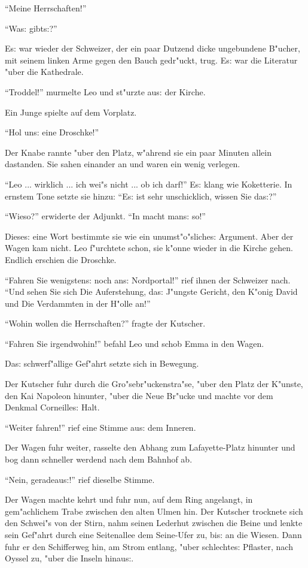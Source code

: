 \documentclass[oneside,12pt]{book}
\newcommand{\s}{s:}%
\begin{document}
"`Meine Herrschaften!"'

"`Wa{\s} gibt{\s}?"'

E{\s} war wieder der Schweizer, der ein paar Dutzend dicke
ungebundene B"ucher, mit seinem linken Arme gegen den Bauch
gedr"uckt, trug. E{\s} war die Literatur "uber die Kathedrale.

"`Troddel!"' murmelte Leo und st"urzte au{\s} der Kirche.

Ein Junge spielte auf dem Vorplatz.

"`Hol un{\s} eine Droschke!"'

Der Knabe rannte "uber den Platz, w"ahrend sie ein paar Minuten
allein dastanden. Sie sahen einander an und waren ein wenig
verlegen.

"`Leo ... wirklich ... ich wei"s nicht ... ob ich darf!"' E{\s}
klang wie Koketterie. In ernstem Tone setzte sie hinzu: "`E{\s}
ist sehr unschicklich, wissen Sie da{\s}?"'

"`Wieso?"' erwiderte der Adjunkt. "`In \so{Pari{\s}} macht man{\s}
so!"'

Diese{\s} eine Wort bestimmte sie wie ein unumst"o"sliche{\s}
Argument. Aber der Wagen kam nicht. Leo f"urchtete schon, sie
k"onne wieder in die Kirche gehen. Endlich erschien die Droschke.

"`Fahren Sie wenigsten{\s} noch an{\s} Nordportal!"' rief ihnen
der Schweizer nach. "`Und sehen Sie sich {\glq}Die
Auferstehung{\grq}, da{\s} {\glq}J"ungste Gericht{\grq}, den
{\glq}K"onig David{\grq} und {\glq}Die Verdammten in der
H"olle{\grq} an!"'

"`Wohin wollen die Herrschaften?"' fragte der Kutscher.

"`Fahren Sie irgendwohin!"' befahl Leo und schob Emma in den Wagen.

Da{\s} schwerf"allige Gef"ahrt setzte sich in Bewegung.

Der Kutscher fuhr durch die Gro"sebr"uckenstra"se, "uber den Platz
der K"unste, den Kai Napoleon hinunter, "uber die Neue Br"ucke und
machte vor dem Denkmal Corneille{\s} Halt.

"`Weiter fahren!"' rief eine Stimme au{\s} dem Inneren.

Der Wagen fuhr weiter, rasselte den Abhang zum Lafayette-Platz
hinunter und bog dann schneller werdend nach dem Bahnhof ab.

"`Nein, geradeau{\s}!"' rief dieselbe Stimme.

Der Wagen machte kehrt und fuhr nun, auf dem Ring angelangt, in
gem"achlichem Trabe zwischen den alten Ulmen hin. Der Kutscher
trocknete sich den Schwei"s von der Stirn, nahm seinen Lederhut
zwischen die Beine und lenkte sein Gef"ahrt durch eine Seitenallee
dem Seine-Ufer zu, bi{\s} an die Wiesen. Dann fuhr er den
Schifferweg hin, am Strom entlang, "uber schlechte{\s} Pflaster,
nach Oyssel zu, "uber die Inseln hinau{\s}.
\end{document}
